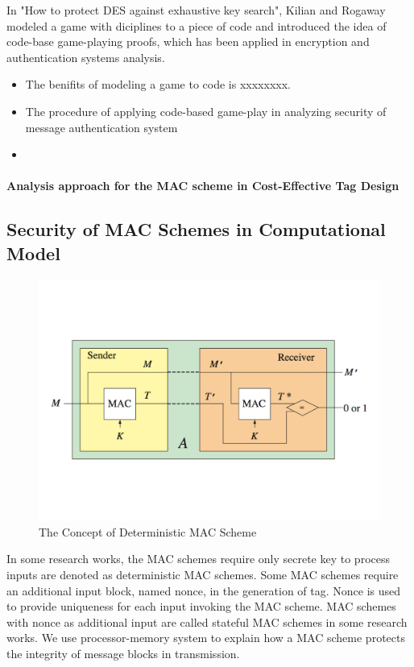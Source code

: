\documentclass{article}
\begin{document}
In "How to protect DES against exhaustive key search", Kilian and Rogaway modeled a game with diciplines to a piece of code and introduced the idea of code-base game-playing proofs, which has been applied in encryption and authentication systems analysis. 
\begin{itemize}
	\item The benifits of modeling a game to code is xxxxxxxx.
	\item The procedure of applying code-based game-play in analyzing security of message authentication system
	\item 
\end{itemize}

\paragraph{Analysis approach for the MAC scheme in Cost-Effective Tag Design}

\subsection{Security of MAC Schemes in Computational Model}
\begin{figure}[htbp]
\centering
\includegraphics[scale=0.4]{./diagrams/MAC.pdf}
\caption{The Concept of Deterministic MAC Scheme}
\label{deterministic_mac }
\end{figure}
In some research works, the MAC schemes require only secrete key to process inputs are denoted as deterministic MAC schemes.
Some MAC schemes require an additional input block, named nonce, in the generation of tag. Nonce is used to provide uniqueness for each input invoking the MAC scheme. MAC schemes with nonce as additional input are called stateful MAC schemes in some research works.
We use processor-memory system to explain how a MAC scheme protects the integrity of message blocks in transmission. 
\end{document}
